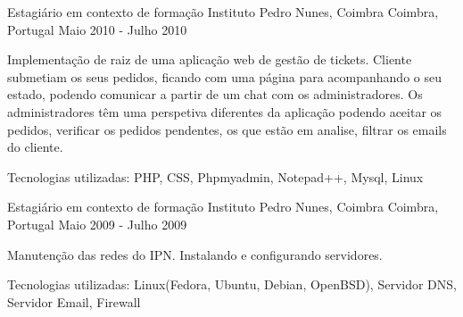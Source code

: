 \begin{cventries}

\cventry
{Estagiário em contexto de formação} %
{Instituto Pedro Nunes, Coimbra} %
{Coimbra, Portugal} %
{Maio 2010 - Julho 2010} %
{ %
\begin{cvitems}
\item {Implementação de raiz de uma aplicação web de gestão de tickets. Cliente submetiam os seus pedidos, ficando com uma página para acompanhando o seu estado, podendo comunicar a partir de um chat com os administradores. Os administradores têm uma perspetiva diferentes da aplicação podendo aceitar os pedidos, verificar os pedidos pendentes, os que estão em analise, filtrar os emails do cliente.}
\item{Tecnologias utilizadas: PHP, CSS, Phpmyadmin, Notepad++, Mysql, Linux }
\end{cvitems}
}


\cventry
{Estagiário em contexto de formação} %
{Instituto Pedro Nunes, Coimbra} %
{Coimbra, Portugal} %
{Maio 2009 - Julho 2009} %
{ %
\begin{cvitems}
\item {Manutenção das redes do IPN. Instalando e configurando servidores.}
\item{Tecnologias utilizadas: Linux(Fedora, Ubuntu, Debian, OpenBSD), Servidor DNS, Servidor Email, Firewall }
\end{cvitems}
}




\end{cventries}